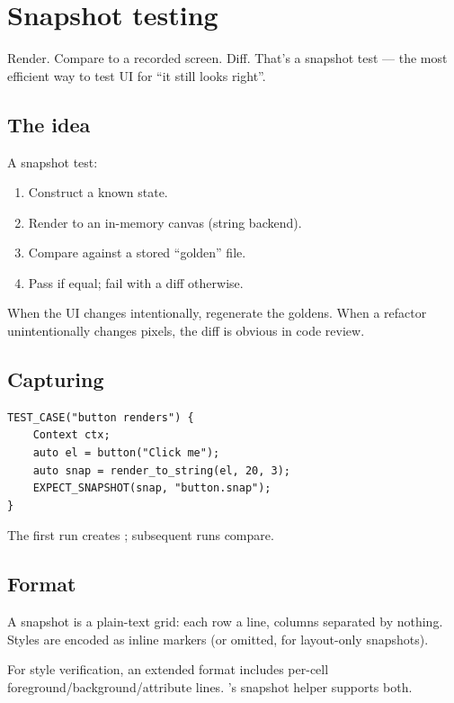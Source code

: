 \chapter{Snapshot testing}
\label{ch:snapshot}

\begin{aside}
Render. Compare to a recorded screen. Diff. That's a snapshot
test --- the most efficient way to test UI for ``it still looks
right''.
\end{aside}

\section{The idea}

A snapshot test:

\begin{enumerate}[leftmargin=*]
  \item Construct a known state.
  \item Render to an in-memory canvas (string backend).
  \item Compare against a stored ``golden'' file.
  \item Pass if equal; fail with a diff otherwise.
\end{enumerate}

When the UI changes intentionally, regenerate the goldens.
When a refactor unintentionally changes pixels, the diff is
obvious in code review.

\section{Capturing}

\begin{lstlisting}
TEST_CASE("button renders") {
    Context ctx;
    auto el = button("Click me");
    auto snap = render_to_string(el, 20, 3);
    EXPECT_SNAPSHOT(snap, "button.snap");
}
\end{lstlisting}

The first run creates ; subsequent runs
compare.

\section{Format}

A snapshot is a plain-text grid: each row a line, columns
separated by nothing. Styles are encoded as inline markers
(or omitted, for layout-only snapshots).

For style verification, an extended format includes per-cell
foreground/background/attribute lines. \maya{}'s snapshot
helper supports both.


